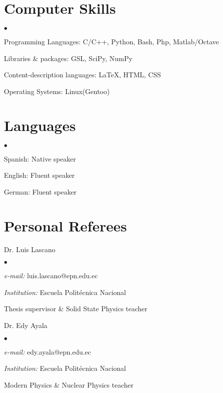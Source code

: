 \documentclass[margin,line]{res}
\newenvironment{list1}{
  \begin{list}{\ding{113}}{%
      \setlength{\itemsep}{0in}
      \setlength{\parsep}{0in} \setlength{\parskip}{0in}
      \setlength{\topsep}{0in} \setlength{\partopsep}{0in} 
      \setlength{\leftmargin}{0.17in}}}{\end{list}}
\newenvironment{list2}{
  \begin{list}{$\bullet$}{%
      \setlength{\itemsep}{0in}
      \setlength{\parsep}{0in} \setlength{\parskip}{0in}
      \setlength{\topsep}{0in} \setlength{\partopsep}{0in} 
      \setlength{\leftmargin}{0.2in}}}{\end{list}}
\begin{document}
\begin{resume}
\section{\sc Computer Skills}
  \begin{list2}
    \item Programming Languages:  C/C++, Python, Bash, Php, Matlab/Octave
    \item Libraries \& packages: GSL, SciPy, NumPy
    \item Content-description languages: \LaTeX, HTML, CSS
    \item Operating Systems:  Linux(Gentoo)
  \end{list2}

\section{\sc Languages}
  \begin{list2}
    \item Spanish: Native speaker
    \item English: Fluent speaker
    \item German: Fluent speaker
  \end{list2}
  
\section{\sc Personal Referees}
 \begin{list1}
  \item[] Dr. Luis Lascano
  \begin{list2}
   \item {\it e-mail:} luis.lascano@epn.edu.ec
   \item {\it Institution:} Escuela Politécnica Nacional
   \item Thesis supervisor \& Solid State Physics teacher
  \end{list2}
 \end{list1}

 \begin{list1}
  \item[] Dr. Edy Ayala
  \begin{list2}
   \item {\it e-mail:} edy.ayala@epn.edu.ec
   \item {\it Institution:} Escuela Politécnica Nacional
   \item Modern Physics \& Nuclear Physics teacher
  \end{list2}
 \end{list1}
 

\end{resume}
\end{document}

